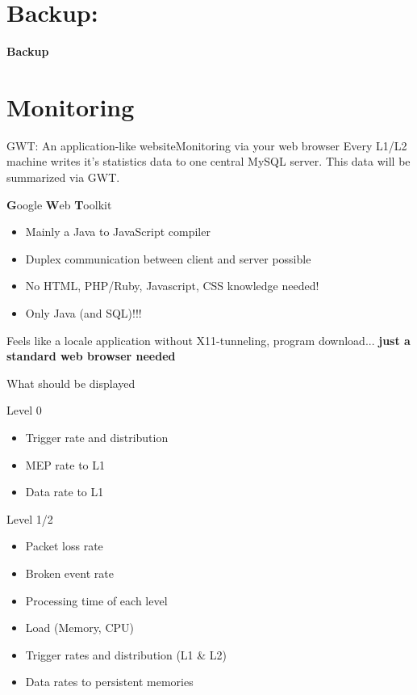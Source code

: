 \section{Backup:}

\begin{frame}{}
	\begin{center}
		\textbf{Backup}
	\end{center} 
\end{frame}


\section{Monitoring}


\begin{frame}{GWT: An application-like website}{Monitoring via your web browser}
	Every L1/L2 machine writes it's statistics data to one central MySQL server.
	This data will be summarized via GWT.
	\begin{block}{\textbf{G}oogle \textbf{W}eb \textbf{T}oolkit }
		\begin{itemize}
		  \item Mainly a Java to JavaScript compiler
		  \item Duplex communication between client and server possible
		  \item No HTML, PHP/Ruby, Javascript, CSS knowledge needed!
		  \item Only Java (and SQL)!!!
		\end{itemize}
		\begin{ergo}
			Feels like a locale application without X11-tunneling, program download...
			\textbf{just a standard web browser needed}
		\end{ergo}
	\end{block}
\end{frame}


\begin{frame}{What should be displayed}
	\begin{block}{Level 0}
		\begin{itemize}
		  \item Trigger rate and distribution
		  \item MEP rate to L1
		  \item Data rate to L1
		\end{itemize}	
	\end{block}
	
		\begin{block}{Level 1/2}
		\begin{itemize}
		  \item Packet loss rate
		  \item Broken event rate
		  \item Processing time of each level
		  \item Load (Memory, CPU)
		  \item Trigger rates and distribution (L1 \& L2)
		  \item Data rates to persistent memories
		\end{itemize}
	\end{block}
\end{frame}

